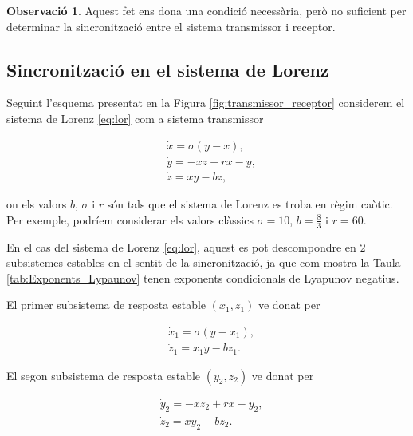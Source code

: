 \documentclass[11pt,a4paper,openright,oneside]{article}
\numberwithin{equation}{section}
\theoremstyle{definition}
\newtheorem{obs}[teo]{Observaci\'o}
\begin{document}
\begin{obs}
    Aquest fet ens dona una condició necessària, però no suficient per determinar la sincronització entre el sistema transmissor i receptor.
\end{obs}

\subsection{Sincronització en el sistema de Lorenz}

Seguint l'esquema presentat en la Figura \ref{fig:transmissor_receptor} considerem el sistema de Lorenz \eqref{eq:lor} com a sistema transmissor

\begin{equation} \begin{aligned} \label{eq:lor}
    &\dot{x}=\sigma(y-x),\\ 
    &\dot{y}=-xz+rx-y, \\
    &\dot{z}=xy-bz,
\end{aligned} \end{equation}

on els valors $b$, $\sigma$ i $r$ són tals que el sistema de Lorenz es troba en règim caòtic. Per exemple, podríem considerar els valors clàssics $\sigma=10$, $b=\frac{8}{3}$ i $r=60$.

En el cas del sistema de Lorenz \eqref{eq:lor}, aquest es pot descompondre en $2$ subsistemes estables en el sentit de la sincronització, ja que com mostra la Taula \ref{tab:Exponents_Lypaunov} tenen exponents condicionals de Lyapunov negatius. 

El primer subsistema de resposta estable $(x_1,z_1)$ ve donat per 

\begin{equation} \begin{aligned} \label{eq:resposta1}
    &\dot{x}_1=\sigma(y-x_1),\\ 
    &\dot{z}_1=x_1y-bz_1.
\end{aligned} \end{equation}

El segon subsistema de resposta estable $(y_2,z_2)$ ve donat per 

\begin{equation} \begin{aligned} \label{eq:resposta2}
    &\dot{y}_2=-xz_2+rx-y_2, \\ 
    &\dot{z}_2=xy_2-bz_2.
\end{aligned} \end{equation}
\end{document}

